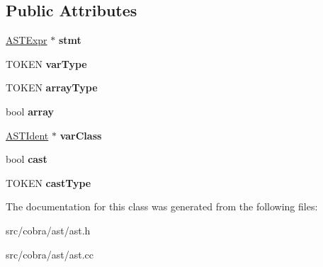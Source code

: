 \subsection*{Public Attributes}
\begin{DoxyCompactItemize}
\item 
\hypertarget{class_cobra_1_1internal_1_1_a_s_t_var_a92b7bdd48d6f1c52f5dc5390c7878b6c}{\hyperlink{class_cobra_1_1internal_1_1_a_s_t_expr}{A\+S\+T\+Expr} $\ast$ {\bfseries stmt}}\label{class_cobra_1_1internal_1_1_a_s_t_var_a92b7bdd48d6f1c52f5dc5390c7878b6c}

\item 
\hypertarget{class_cobra_1_1internal_1_1_a_s_t_var_a86c85537f17d498f5b0fcf15e22e76ad}{T\+O\+K\+E\+N {\bfseries var\+Type}}\label{class_cobra_1_1internal_1_1_a_s_t_var_a86c85537f17d498f5b0fcf15e22e76ad}

\item 
\hypertarget{class_cobra_1_1internal_1_1_a_s_t_var_a0e2e0adc76754328f4d85a8616daded2}{T\+O\+K\+E\+N {\bfseries array\+Type}}\label{class_cobra_1_1internal_1_1_a_s_t_var_a0e2e0adc76754328f4d85a8616daded2}

\item 
\hypertarget{class_cobra_1_1internal_1_1_a_s_t_var_ab292239765df26cb8e4ec6062d9fa4d3}{bool {\bfseries array}}\label{class_cobra_1_1internal_1_1_a_s_t_var_ab292239765df26cb8e4ec6062d9fa4d3}

\item 
\hypertarget{class_cobra_1_1internal_1_1_a_s_t_var_a6a00a268063517fbe45c2a9700f2c117}{\hyperlink{class_cobra_1_1internal_1_1_a_s_t_ident}{A\+S\+T\+Ident} $\ast$ {\bfseries var\+Class}}\label{class_cobra_1_1internal_1_1_a_s_t_var_a6a00a268063517fbe45c2a9700f2c117}

\item 
\hypertarget{class_cobra_1_1internal_1_1_a_s_t_var_a7ac1d0995a7a118ca8e1b5851c87d1e1}{bool {\bfseries cast}}\label{class_cobra_1_1internal_1_1_a_s_t_var_a7ac1d0995a7a118ca8e1b5851c87d1e1}

\item 
\hypertarget{class_cobra_1_1internal_1_1_a_s_t_var_ad330198db949f75d27f99db886889b3a}{T\+O\+K\+E\+N {\bfseries cast\+Type}}\label{class_cobra_1_1internal_1_1_a_s_t_var_ad330198db949f75d27f99db886889b3a}

\end{DoxyCompactItemize}


The documentation for this class was generated from the following files\+:\begin{DoxyCompactItemize}
\item 
src/cobra/ast/ast.\+h\item 
src/cobra/ast/ast.\+cc\end{DoxyCompactItemize}
